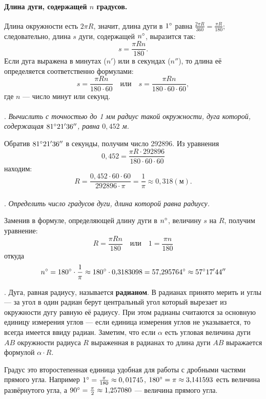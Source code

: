 \documentclass[oneside]{book}
\makeatletter
\newcommand{\rindex}[2][\imki@jobname]{%
  \index[#1]{\detokenize{#2}}%
}
\makeatother
\begin{document}
\paragraph{Длина дуги, содержащей $n$ градусов.}\label{1938/239}
Длина окружности есть $2\pi R$, значит, длина дуги в $1\degree$ равна $\frac{2\pi R}{360}=\frac{\pi R}{180}$; следовательно, длина $s$ дуги, содержащей $n\degree$, выразится так:
\[s=\frac{\pi R n}{180}.\]
Если дуга выражена в минутах ($n'$) или в секундах ($n''$), то длина её определяется соответственно формулами:
\[s=\frac{\pi R n}{180\cdot 60}
\quad\text{или}\quad
s=\frac{\pi R n}{180\cdot 60\cdot 60},\]
где $n$ — число минут или секунд.

\paragraph{}\label{1938/240}
.
\emph{Вычислить с точностью до 1 мм радиус такой окружности, дуга которой, содержащая $81\degree 21'36''$, равна $0{,}452$ м.}

Обратив $81\degree 21'36''$ в секунды, получим число 292896.
Из уравнения
\[0{,}452 = \frac{\pi R\cdot  292896}{180\cdot 60\cdot 60}\]
находим:
\[R=\frac{0{,}452\cdot 60\cdot 60}{292896\cdot \pi}=\frac1\pi\approx0{,}318 (\text{м}).\]

\paragraph{}\label{1938/241}
.
\emph{Определить число градусов дуги, длина которой равна радиусу.}

Заменив в формуле, определяющей длину дуги в $n\degree$, величину $s$ на $R$, получим уравнение:
\[R=\frac{\pi R n}{180}
\quad\text{или}\quad
1=\frac{\pi n}{180}\]
откуда
\[n\degree = 180\degree \cdot \frac1\pi \approx 180\degree \cdot 0{,}3183098 = 57{,}295764\degree \approx 57\degree17'44''\]

\smallskip
{}.
Дуга, равная радиусу, называется \rindex{радиан}\textbf{радианом}.
В радианах принято мерить и углы — за угол в один радиан берут центральный угол который вырезает из окружности дугу равную её радиусу.
При этом радианы считаются за основную единицу измерения углов --- если единица измерения углов не указывается, то всегда имеется ввиду радиан.
Заметим, что если $\alpha$ есть угловая величина дуги $AB$ окружности радиуса $R$ выраженная в радианах то длина дуги $AB$ выражается формулой $\alpha\cdot R$.

Градус это второстепенная единица удобная для работы с дробными частями прямого угла.
Например 
$1\degree =\tfrac\pi{180}\approx 0{,01745}$,
$180\degree\z=\pi\z\approx 3{,}141593$ есть величина развёрнутого угла, а
$90\degree=\tfrac\pi2\z\approx1{,}257080$ — величина прямого угла.
\end{document}
